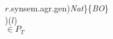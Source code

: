\begin{enumerate}
\begin{enumerate}
{{{{{{{{                                                                                                                                  $r$.synsem.agr.gen)}{\textit{Nat}}}\}}{\{\textit{BO}\}}}}
                                                                                                                          \\
                                                           }}})($l$)
                          \\
$\in P_T$
                                                                                                                          
                      
\end{enumerate} 
  

\end{enumerate}
